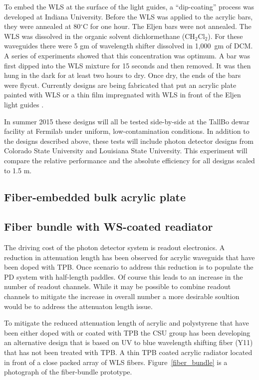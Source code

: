 To embed the WLS at the surface of the light guides, a ``dip-coating''
process was developed at Indiana University.  Before the WLS was
applied to the acrylic bars, they were annealed at 80$^\circ$C for one
hour.  The Eljen bars were not annealed.  The WLS was dissolved in the
organic solvent dichlormethane (CH$_2$Cl$_2$).  For these waveguides
there were 5 gm of wavelength shifter dissolved in 1,000~gm of DCM.  A
series of experiments showed that this concentration was optimum.  A
bar was first dipped into the WLS mixture for 15 seconds and then
removed.  It was then hung in the dark for at least two hours to dry.
Once dry, the ends of the bars were flycut.  Currently designs are
being fabricated that put an acrylic plate painted with WLS or a thin
film impregnated with WLS in front of the Eljen light guides .

In summer 2015 these designs will all be tested side-by-side at the
TallBo dewar facility at Fermilab under uniform, low-contamination
conditions.  In addition to the designs described above, these tests
will include photon detector designs from Colorado State University
and Louisiana State University.  This experiment will compare the
relative performance and the absolute efficiency for all designs
scaled to 1.5 m.

\subsection{Fiber-embedded bulk acrylic plate}

\subsection{Fiber bundle with WS-coated readiator}

The driving cost of the photon detector system is readout
electronics. A reduction in attenuation length has been observed for
acrylic waveguids that have been doped with TPB. Once scenario to
address this reduction is to populate the PD system with half-length
paddles. Of course this leads to an increase in the number of readout
channels. While it may be possible to combine readout channels to
mitigate the increase in overall number a more desirable soultion
would be to address the attenuaton length issue.   

To mitigate the reduced attenuation length of acrylic and polystyrene
that have been either doped with or coated with TPB the CSU group has
been developing an alternative design that is based on UV to blue
wavelength shifting fiber (Y11) that has not been treated with TPB.  A
thin TPB coated acrylic radiator located in front of a close packed
array of WLS fibers. Figure~\ref{fiber_bundle} is a photograph of the
fiber-bundle prototype. 

